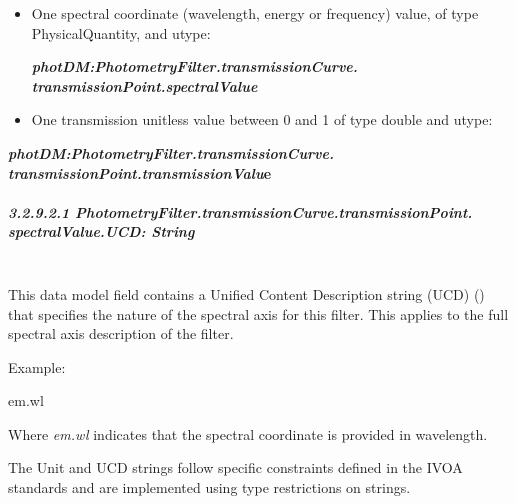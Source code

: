 \documentclass[11pt,a4paper]{ivoa}
\begin{document}
\begin{itemize}
	\item One spectral coordinate (wavelength, energy or frequency) value, of type 
	PhysicalQuantity, and utype:\par

\begin{center}
{\fontsize{10pt}{12.0pt}\selectfont 
\textbf{\textit{photDM:PhotometryFilter.transmissionCurve.
transmissionPoint.spectralValue}}\par}
\end{center}\par

	\item One transmission unitless value between 0 and 1 of type double and 
	utype:{\fontsize{11pt}{13.2pt}\selectfont \textit{ }\par}
\end{itemize}\par

\begin{center}
{\fontsize{10pt}{12.0pt}\selectfont \textbf{\textit{photDM:PhotometryFilter.transmissionCurve.
transmissionPoint.transmissionValu}e}\par}
\end{center}\par

\subparagraph{3.2.9.2.1
PhotometryFilter.transmissionCurve.transmissionPoint.
spectralValue.UCD: String} \hspace{0pt} \\
This data model field contains a Unified Content Description string (UCD) 
(\citep{2007ivoa.spec.0402M}) that specifies the nature of the spectral axis for this filter. 
This applies to the full spectral axis description of the filter.
\par

Example:
\par



em.wl
\bigskip




Where \textit{em.wl }indicates that the spectral coordinate is provided in wavelength.
\par

The Unit and UCD strings follow specific constraints defined in the IVOA standards and are 
implemented using type restrictions on strings.
\par
\end{document}
